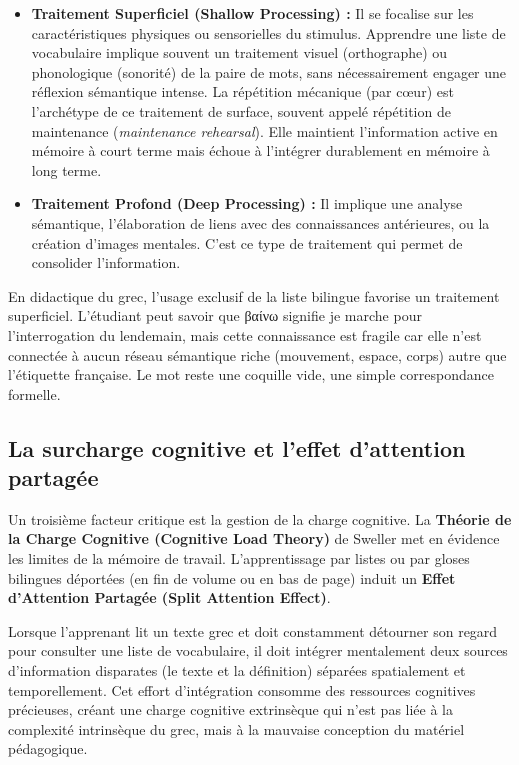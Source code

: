 \begin{itemize}\item \textbf{Traitement Superficiel (Shallow Processing) :} Il se focalise sur les caractéristiques physiques ou sensorielles du stimulus. Apprendre une liste de vocabulaire implique souvent un traitement visuel (orthographe) ou phonologique (sonorité) de la paire de mots, sans nécessairement engager une réflexion sémantique intense. La répétition mécanique (\og par cœur\fg{}) est l'archétype de ce traitement de surface, souvent appelé \og répétition de maintenance\fg{} (\textit{maintenance rehearsal}). Elle maintient l'information active en mémoire à court terme mais échoue à l'intégrer durablement en mémoire à long terme.\cite{III-1-3-ref8}\item \textbf{Traitement Profond (Deep Processing) :} Il implique une analyse sémantique, l'élaboration de liens avec des connaissances antérieures, ou la création d'images mentales. C'est ce type de traitement qui permet de consolider l'information.\cite{III-1-3-ref11}\end{itemize}En didactique du grec, l'usage exclusif de la liste bilingue favorise un traitement superficiel.
L'étudiant peut \og savoir\fg{} que βαίνω signifie \og je marche\fg{} pour l'interrogation du
lendemain, mais cette connaissance est fragile car elle n'est connectée à aucun réseau sémantique
riche (mouvement, espace, corps) autre que l'étiquette française. Le mot reste une coquille vide,
une simple correspondance formelle.



\subsection{La surcharge cognitive et l'effet d'attention partagée}

Un troisième facteur critique est la gestion de la charge cognitive. La \textbf{Théorie de la Charge
Cognitive (Cognitive Load Theory)} de Sweller met en évidence les limites de la mémoire de travail.
L'apprentissage par listes ou par gloses bilingues déportées (en fin de volume ou en bas de page)
induit un \textbf{Effet d'Attention Partagée (Split Attention Effect)}.\cite{III-1-3-ref13}

Lorsque l'apprenant lit un texte grec et doit constamment détourner son regard pour consulter une
liste de vocabulaire, il doit intégrer mentalement deux sources d'information disparates (le texte
et la définition) séparées spatialement et temporellement. Cet effort d'intégration consomme des
ressources cognitives précieuses, créant une charge cognitive \og extrinsèque\fg{} qui n'est pas
liée à la complexité intrinsèque du grec, mais à la mauvaise conception du matériel
pédagogique.\cite{III-1-3-ref15}

